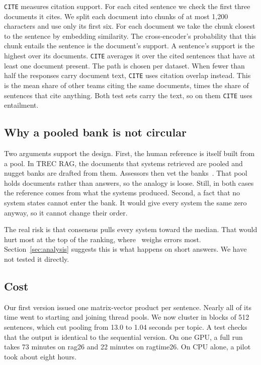 \texttt{CITE} measures citation support. For each cited sentence we check the first
three documents it cites. We split each document into chunks of at most 1,200
characters and use only its first six. For each document we take the chunk closest
to the sentence by embedding similarity. The cross-encoder's probability that this
chunk entails the sentence is the document's support. A sentence's support is the
highest over its documents. \texttt{CITE} averages it over the cited sentences that
have at least one document present. The path is chosen per dataset. When fewer
than half the responses carry document text, \texttt{CITE} uses citation overlap
instead. This is the mean share of other teams citing the same documents, times the
share of sentences that cite anything. Both test sets carry the text, so on them
\texttt{CITE} uses entailment.

\subsection{Why a pooled bank is not circular}

Two arguments support the design. First, the human reference is itself built from
a pool. In TREC RAG, the documents that systems retrieved are pooled and nugget
banks are drafted from them. Assessors then vet the
banks~\cite{pradeep2024initial}. That pool holds documents rather than answers, so
the analogy is loose. Still, in both cases the reference comes from what the
systems produced. Second, a fact that no system states cannot enter the bank. It
would give every system the same zero anyway, so it cannot change their order.

The real risk is that consensus pulls every system toward the median. That would
hurt most at the top of the ranking, where \tauap\ weighs errors most.
Section~\ref{sec:analysis} suggests this is what happens on short answers. We have
not tested it directly.

\subsection{Cost}

Our first version issued one matrix-vector product per sentence. Nearly all of its
time went to starting and joining thread pools. We now cluster in blocks of 512
sentences, which cut pooling from 13.0 to 1.04 seconds per topic. A test checks
that the output is identical to the sequential version. On one GPU, a full run
takes 73 minutes on rag26 and 22 minutes on ragtime26. On CPU alone, a pilot took
about eight hours.
